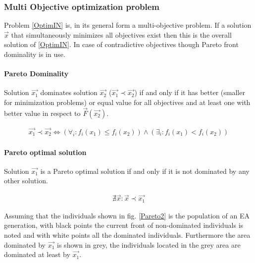 \subsubsection{Multi Objective optimization problem}
Problem \ref{OptimIN} is, in its general form a multi-objective problem. If a solution $\vec{x}$ that simultaneously minimizes all objectives exist then this is the overall solution of \ref{OptimIN}. In case of contradictive objectives though Pareto front dominality is in use.

\paragraph{Pareto Dominality} Solution $\overrightarrow{x_1}$ dominates solution $\vec{x_2}$ ($\vec{x_1}\prec\vec{x_2}$) if and only if it has better (smaller for minimization problems) or equal value for all objectives and at least one with better value in respect to $\vec{F}(\vec{x_2})$.

\begin{eqnarray}
    \vec{x_1}\prec\vec{x_2} \Leftrightarrow (\forall _i :  f_i(x_1) \leq f_i(x_2))\wedge (\exists _i : f_i(x_1) < f_i(x_2))
   \label{pareto_eq} 
\end{eqnarray}

\paragraph{Pareto optimal solution} Solution  $\vec{x_1}$ is a Pareto optimal solution if and only if it is not dominated by any other solution.%


\begin{eqnarray}
    \nexists\vec{x}:\vec{x}\prec\vec{x_1}
\end{eqnarray}
 

Assuming that the individuals shown in fig. \ref{Pareto2} is the population of an EA generation, with black points the current front of non-dominated individuals is noted and with white points all the dominated individuals. Furthermore the area dominated by $\vec{x_1}$ is shown in grey, the individuals located in the grey area are dominated at least by $\vec{x_1}$. 

